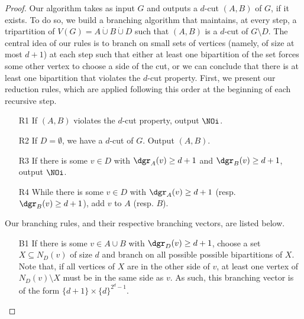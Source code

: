 \begin{proof}
    Our algorithm takes as input $G$ and outputs a $d$-cut $(A, B)$ of $G$, if it exists.
    To do so, we build a branching algorithm that maintains, at every step, a tripartition of $V(G) = A \dot\cup B \dot\cup D$ such that $(A, B)$ is a $d$-cut of $G \setminus D$.
    The central idea of our rules is to branch on small  sets of vertices (namely, of size at most $d+1$) at each step such that either at least one bipartition of the set forces some other vertex to choose a side of the cut, or we can conclude that there is at least one bipartition that violates the $d$-cut property.
    First, we present our reduction rules, which are applied following this order at the beginning of each recursive step.

    \begin{itemize}
        \item[R1] If $(A, B)$ violates the $d$-cut property, output $\NOi$.
        \item[R2] If $D = \emptyset$, we have a $d$-cut of $G$. Output $(A,B)$.
        \item[R3] If there is some $v \in D$ with $\dgr_A(v) \geq d + 1$ and $\dgr_B(v) \geq d+1$, output $\NOi$.
        \item[R4] While there is some $v \in D$ with $\dgr_A(v) \geq d + 1$ (resp. $\dgr_B(v) \geq d+1$), add $v$ to $A$ (resp. $B$).
    \end{itemize}

    Our branching rules, and their respective branching vectors, are listed below.

    \begin{itemize}
        \item[B1] If there is some $v \in A \cup B$ with $\dgr_D(v) \geq d+1$, choose a set $X \subseteq N_D(v)$ of size $d$ and branch on all possible possible bipartitions of $X$.
        Note that, if all vertices of $X$ are in the other side of $v$, at least one vertex of $N_D(v) \setminus X$ must be in the same side as $v$.
        As such, this branching vector is of the form $\{d+1\} \times \{d\}^{2^d-1}$.



\end{itemize}
\end{proof}
